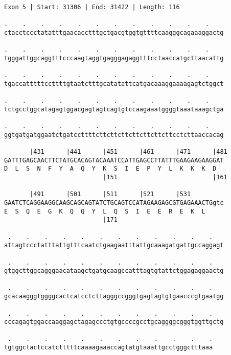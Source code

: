 \documentclass{article}
\begin{document}
\begin{Verbatim}[fontfamily=courier]
Exon 5 | Start: 31306 | End: 31422 | Length: 116

.    .    .    .    .    .    .    .    .    .    .    .    
ctacctccctatatttgaacacctttgctgacgtggtgttttcaagggcagaaaggactg

.    .    .    .    .    .    .    .    .    .    .    .    
tgggattggcaggtttcccaagtaggtgagggagaggtttcctaaccatgcttaacattg

.    .    .    .    .    .    .    .    .    .    .    .    
tgaccatttttccttttgtaatctttgcatatattcatgacaaaggaaaagagtctggct

.    .    .    .    .    .    .    .    .    .    .    .    
tctgcctggcatagagtggacgagtagtcagtgtccaagaaatggggtaaataaagctga

.    .    .    .    .    .    .    .    .    .    .    .    
ggtgatgatggaatctgatccttttcttcttcttcttcttcttcttcctcttaaccacag

       |431      |441      |451      |461      |471      |481
GATTTGAGCAACTTCTATGCACAGTACAAATCCATTGAGCCTTATTTGAAGAAGAAGGAT
D  L  S  N  F  Y  A  Q  Y  K  S  I  E  P  Y  L  K  K  K  D  
                           |151                          |161

       |491      |501      |511      |521      |531         
GAATCTCAGGAAGGCAAGCAGCAGTATCTGCAGTCCATAGAAGAGCGTGAGAAACTGgtc
E  S  Q  E  G  K  Q  Q  Y  L  Q  S  I  E  E  R  E  K  L     
                           |171                             

 .    .    .    .    .    .    .    .    .    .    .    .   
attagtccctatttattgtttcaatctgaagaatttattgcaaagatgattgccaggagt

 .    .    .    .    .    .    .    .    .    .    .    .   
gtggcttggcagggaacataagctgatgcaagccatttagtgtattctggagaggaactg

 .    .    .    .    .    .    .    .    .    .    .    .   
gcacaagggtggggcactcatcctcttagggccgggtgagtagtgtgaacccgtgaatgg

 .    .    .    .    .    .    .    .    .    .    .    .   
cccagagtggaccaaggagctagagccctgtgccccgcctgcaggggcgggtggttgctg

 .    .    .    .    .    .    .    .    .    .    .    .
tgtggctactccatctttttcaaaagaaaccagtatgtaaattgcctgggctttaaa
\end{Verbatim}
\newpage
\end{document}
